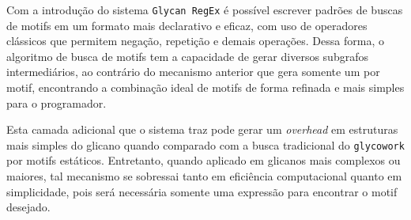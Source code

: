 Com a introdução do sistema \texttt{Glycan RegEx} é possível escrever padrões
de buscas de motifs em um formato mais declarativo e eficaz, com uso de
operadores clássicos que permitem negação, repetição e demais operações. Dessa
forma, o algoritmo de busca de motifs tem a capacidade de gerar diversos
subgrafos intermediários, ao contrário do mecanismo anterior que gera somente
um por motif, encontrando a combinação ideal de motifs de forma refinada e mais
simples para o programador.

Esta camada adicional que o sistema traz pode gerar um \textit{overhead} em
estruturas mais simples do glicano quando comparado com a busca tradicional do
\texttt{glycowork} por motifs estáticos. Entretanto, quando aplicado em
glicanos mais complexos ou maiores, tal mecanismo se sobressai tanto em
eficiência computacional quanto em simplicidade, pois será necessária somente
uma expressão para encontrar o motif desejado.

